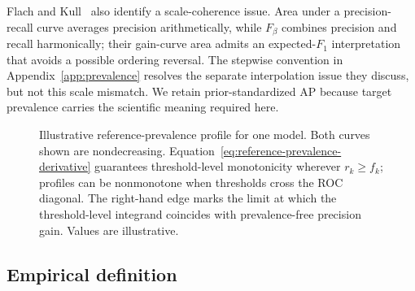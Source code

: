 \documentclass[11pt]{article}
\newcommand{\CNAP}{\operatorname{CNAP}}
\newcommand{\Tpi}{\CNAP_{\pi_\star}}
\newcommand{\SAPHat}{\widehat S_{2,\pi_\star}^{\,\mathrm{AP}}}
\theoremstyle{remark}
\begin{document}
Flach and Kull~\cite{flach2015prg} also identify a scale-coherence issue. Area under a precision-recall curve averages precision arithmetically, while $F_\beta$ combines precision and recall harmonically; their gain-curve area admits an expected-$F_1$ interpretation that avoids a possible ordering reversal. The stepwise convention in Appendix~\ref{app:prevalence} resolves the separate interpolation issue they discuss, but not this scale mismatch. We retain prior-standardized AP because target prevalence carries the scientific meaning required here.

\begin{figure}[ht]
\centering
{}
\caption{Illustrative reference-prevalence profile for one model. Both curves shown are nondecreasing. Equation~\eqref{eq:reference-prevalence-derivative} guarantees threshold-level monotonicity wherever $r_k\geq f_k$; profiles can be nonmonotone when thresholds cross the ROC diagonal. The right-hand edge marks the limit at which the threshold-level integrand coincides with prevalence-free precision gain. Values are illustrative.}
\label{fig:profile}
\end{figure}

\subsection{Empirical definition}
\end{document}

